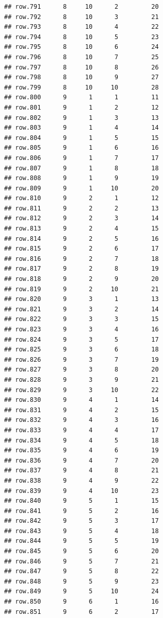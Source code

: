 \documentclass[
]{article}
\begin{document}
\begin{verbatim}
## row.791      8     10      2         20
## row.792      8     10      3         21
## row.793      8     10      4         22
## row.794      8     10      5         23
## row.795      8     10      6         24
## row.796      8     10      7         25
## row.797      8     10      8         26
## row.798      8     10      9         27
## row.799      8     10     10         28
## row.800      9      1      1         11
## row.801      9      1      2         12
## row.802      9      1      3         13
## row.803      9      1      4         14
## row.804      9      1      5         15
## row.805      9      1      6         16
## row.806      9      1      7         17
## row.807      9      1      8         18
## row.808      9      1      9         19
## row.809      9      1     10         20
## row.810      9      2      1         12
## row.811      9      2      2         13
## row.812      9      2      3         14
## row.813      9      2      4         15
## row.814      9      2      5         16
## row.815      9      2      6         17
## row.816      9      2      7         18
## row.817      9      2      8         19
## row.818      9      2      9         20
## row.819      9      2     10         21
## row.820      9      3      1         13
## row.821      9      3      2         14
## row.822      9      3      3         15
## row.823      9      3      4         16
## row.824      9      3      5         17
## row.825      9      3      6         18
## row.826      9      3      7         19
## row.827      9      3      8         20
## row.828      9      3      9         21
## row.829      9      3     10         22
## row.830      9      4      1         14
## row.831      9      4      2         15
## row.832      9      4      3         16
## row.833      9      4      4         17
## row.834      9      4      5         18
## row.835      9      4      6         19
## row.836      9      4      7         20
## row.837      9      4      8         21
## row.838      9      4      9         22
## row.839      9      4     10         23
## row.840      9      5      1         15
## row.841      9      5      2         16
## row.842      9      5      3         17
## row.843      9      5      4         18
## row.844      9      5      5         19
## row.845      9      5      6         20
## row.846      9      5      7         21
## row.847      9      5      8         22
## row.848      9      5      9         23
## row.849      9      5     10         24
## row.850      9      6      1         16
## row.851      9      6      2         17

\end{verbatim}
\end{document}
